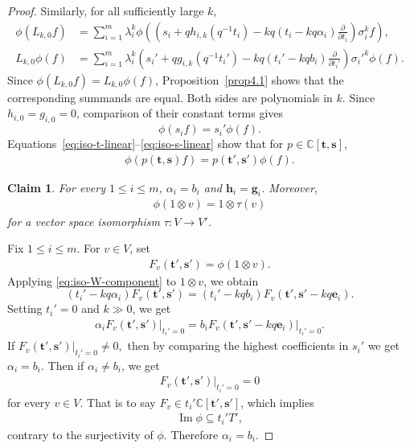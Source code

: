 \documentclass[a4paper]{amsart}
\numberwithin{equation}{section}
\newtheorem{claim}{Claim}
\begin{document}
\begin{proof}
Similarly, for all sufficiently large $k$,
\begin{align*}
\phi(L_{k,0}f)
&=\sum_{i=1}^m\lambda_i^k\phi\left(
\left(s_i+qh_{i,k}(q^{-1}t_i)
-kq(t_i-kq\alpha_i)\frac{\partial}{\partial t_i}\right)
\sigma_i^kf\right),\\
L_{k,0}\phi(f)
&=\sum_{i=1}^m\lambda_i^k
\left(s_i'+qg_{i,k}(q^{-1}t_i')
-kq(t_i'-kqb_i)\frac{\partial}{\partial t_i'}\right)
\sigma_i'^k\phi(f).
\end{align*}
Since $\phi(L_{k,0}f)=L_{k,0}\phi(f)$,
Proposition~\ref{prop4.1} shows that the corresponding summands are
equal. Both sides are polynomials in $k$. Since
$h_{i,0}=g_{i,0}=0$, comparison of their constant terms gives
\begin{equation}\label{eq:iso-s-linear}
\phi(s_if)=s_i'\phi(f).
\end{equation}
Equations~\eqref{eq:iso-t-linear}--\eqref{eq:iso-s-linear} show that for $p\in\mathbb C[\mathbf t,\mathbf s]$,
\begin{align*}
\phi(p(\mathbf t,\mathbf s)f)
=p(\mathbf t',\mathbf s')\phi(f).
\end{align*}


\begin{claim}
For every $1\leq i\leq m$,
$\alpha_i=b_i$ and $\mathbf h_i=\mathbf g_i$. Moreover,
\begin{align*}
\phi(1\otimes v)=1\otimes\tau(v)
\end{align*}
for a vector space isomorphism $\tau:V\to V'$.
\end{claim}
Fix $1\leq i\leq m$. For $v\in V$, set
\begin{align*}
F_v(\mathbf t',\mathbf s')=\phi(1\otimes v).
\end{align*}
Applying \eqref{eq:iso-W-component} to $1\otimes v$, we obtain
\begin{equation}\label{eq:iso-F-shift}
	(t_i'-kq\alpha_i)F_v(\mathbf t',\mathbf s')
	=(t_i'-kqb_i)F_v(\mathbf t',\mathbf s'-kq\mathbf e_i).
\end{equation}
Setting $t_i'=0$ and $k\gg 0$, we get
\begin{align*}
\alpha_i F_v(\mathbf t',\mathbf s')\big|_{t_i'=0}
=b_iF_v(\mathbf t',\mathbf s'-kq\mathbf e_i)\big|_{t_i'=0}.
\end{align*}
If
$F_v(\mathbf t',\mathbf s')\big|_{t_i'=0}\neq0,$
then by comparing the highest coefficients in $s_i'$ we get
$\alpha_i=b_i$. Then if $\alpha_i\neq b_i$, we get
\begin{align*}
F_v(\mathbf t',\mathbf s')\big|_{t_i'=0}=0
\end{align*}
for every $v\in V$. That is to say $F_v\in  t_i'\mathbb{C}[\mathbf t',\mathbf s']$, which implies
\begin{align*}
\operatorname{Im}\phi\subseteq t_i'T',
\end{align*}
contrary to the surjectivity of $\phi$. Therefore
$\alpha_i=b_i$.


\end{proof}
\end{document}
